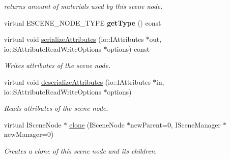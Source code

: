 \begin{DoxyCompactItemize}
\begin{DoxyCompactList}\small\item\em returns amount of materials used by this scene node. \end{DoxyCompactList}\item 
\hypertarget{classirr_1_1scene_1_1_c_sky_dome_scene_node_a385e528d2b59c46540a47c76b47d5cae}{virtual E\-S\-C\-E\-N\-E\-\_\-\-N\-O\-D\-E\-\_\-\-T\-Y\-P\-E {\bfseries get\-Type} () const }\label{classirr_1_1scene_1_1_c_sky_dome_scene_node_a385e528d2b59c46540a47c76b47d5cae}

\item 
\hypertarget{classirr_1_1scene_1_1_c_sky_dome_scene_node_a595e71a332a0459b0eac942f8d212ede}{virtual void \hyperlink{classirr_1_1scene_1_1_c_sky_dome_scene_node_a595e71a332a0459b0eac942f8d212ede}{serialize\-Attributes} (io\-::\-I\-Attributes $\ast$out, io\-::\-S\-Attribute\-Read\-Write\-Options $\ast$options) const }\label{classirr_1_1scene_1_1_c_sky_dome_scene_node_a595e71a332a0459b0eac942f8d212ede}

\begin{DoxyCompactList}\small\item\em Writes attributes of the scene node. \end{DoxyCompactList}\item 
\hypertarget{classirr_1_1scene_1_1_c_sky_dome_scene_node_aa03e6cae822c4556421f11049fe05429}{virtual void \hyperlink{classirr_1_1scene_1_1_c_sky_dome_scene_node_aa03e6cae822c4556421f11049fe05429}{deserialize\-Attributes} (io\-::\-I\-Attributes $\ast$in, io\-::\-S\-Attribute\-Read\-Write\-Options $\ast$options)}\label{classirr_1_1scene_1_1_c_sky_dome_scene_node_aa03e6cae822c4556421f11049fe05429}

\begin{DoxyCompactList}\small\item\em Reads attributes of the scene node. \end{DoxyCompactList}\item 
\hypertarget{classirr_1_1scene_1_1_c_sky_dome_scene_node_ae7e6e5b50f2de6e4ad1e642b5c2d89eb}{virtual I\-Scene\-Node $\ast$ \hyperlink{classirr_1_1scene_1_1_c_sky_dome_scene_node_ae7e6e5b50f2de6e4ad1e642b5c2d89eb}{clone} (I\-Scene\-Node $\ast$new\-Parent=0, I\-Scene\-Manager $\ast$new\-Manager=0)}\label{classirr_1_1scene_1_1_c_sky_dome_scene_node_ae7e6e5b50f2de6e4ad1e642b5c2d89eb}

\begin{DoxyCompactList}\small\item\em Creates a clone of this scene node and its children. \end{DoxyCompactList}\end{DoxyCompactItemize}


